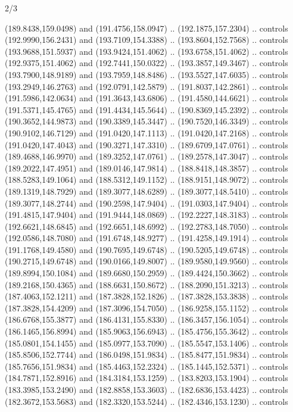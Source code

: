 \begin{flagdescription}{2/3}
\begin{scope}[xshift=0.5\flaglength,yshift=0.5\flagwidth,scale=\flagwidth/180]
\begin{scope}[y=0.8pt, x=0.8pt, yscale=-1,shift={(-168.75,-108.75)}]
  (189.8438,159.0498) and (191.4756,158.0947) .. (192.1875,157.2304) .. controls
  (192.9990,156.2431) and (193.7109,154.3388) .. (193.8604,152.7568) .. controls
  (193.9688,151.5937) and (193.9424,151.4062) .. (193.6758,151.4062) .. controls
  (192.9375,151.4062) and (192.7441,150.0322) .. (193.3857,149.3467) .. controls
  (193.7900,148.9189) and (193.7959,148.8486) .. (193.5527,147.6035) .. controls
  (193.2949,146.2763) and (192.0791,142.5879) .. (191.8037,142.2861) .. controls
  (191.5986,142.0634) and (191.3643,143.6806) .. (191.4580,144.6621) .. controls
  (191.5371,145.4765) and (191.4434,145.5644) .. (190.8369,145.2392) .. controls
  (190.3652,144.9873) and (190.3389,145.3447) .. (190.7520,146.3349) .. controls
  (190.9102,146.7129) and (191.0420,147.1113) .. (191.0420,147.2168) .. controls
  (191.0420,147.4043) and (190.3271,147.3310) .. (189.6709,147.0761) .. controls
  (189.4688,146.9970) and (189.3252,147.0761) .. (189.2578,147.3047) .. controls
  (189.2022,147.4951) and (189.0146,147.9814) .. (188.8418,148.3857) .. controls
  (188.5283,149.1064) and (188.5312,149.1152) .. (188.9151,148.9072) .. controls
  (189.1319,148.7929) and (189.3077,148.6289) .. (189.3077,148.5410) .. controls
  (189.3077,148.2744) and (190.2598,147.9404) .. (191.0303,147.9404) .. controls
  (191.4815,147.9404) and (191.9444,148.0869) .. (192.2227,148.3183) .. controls
  (192.6621,148.6845) and (192.6651,148.6992) .. (192.2783,148.7050) .. controls
  (192.0586,148.7080) and (191.6748,148.9277) .. (191.4258,149.1914) .. controls
  (191.1768,149.4580) and (190.7695,149.6748) .. (190.5205,149.6748) .. controls
  (190.2715,149.6748) and (190.0166,149.8007) .. (189.9580,149.9560) .. controls
  (189.8994,150.1084) and (189.6680,150.2959) .. (189.4424,150.3662) .. controls
  (189.2168,150.4365) and (188.6631,150.8672) .. (188.2090,151.3213) .. controls
  (187.4063,152.1211) and (187.3828,152.1826) .. (187.3828,153.3838) .. controls
  (187.3828,154.4209) and (187.3096,154.7050) .. (186.9258,155.1152) .. controls
  (186.6768,155.3877) and (186.4131,155.8330) .. (186.3457,156.1054) .. controls
  (186.1465,156.8994) and (185.9063,156.6943) .. (185.4756,155.3642) .. controls
  (185.0801,154.1455) and (185.0977,153.7090) .. (185.5547,153.1406) .. controls
  (185.8506,152.7744) and (186.0498,151.9834) .. (185.8477,151.9834) .. controls
  (185.7656,151.9834) and (185.4463,152.2324) .. (185.1445,152.5371) .. controls
  (184.7871,152.8916) and (184.3184,153.1259) .. (183.8203,153.1904) .. controls
  (183.3985,153.2490) and (182.8858,153.3603) .. (182.6836,153.4423) .. controls
  (182.3672,153.5683) and (182.3320,153.5244) .. (182.4346,153.1230) .. controls

\end{scope}
\end{scope}
\end{flagdescription}
